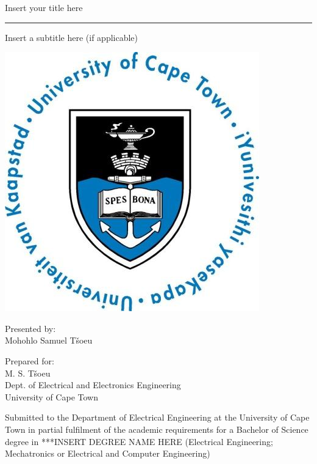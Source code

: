 \documentclass[a4paper,11pt]{report}
\begin{document}
 
\thispagestyle{empty}
{\Huge \begin{center}
Insert your title here
\hrule 
{\Large Insert a subtitle here (if applicable)}
\end{center}}

\vskip 5mm
\begin{center}
\- \- \- \- \- \- \- \- \- \-\includegraphics[scale = 0.3]{uctLogo.png}
\end{center}

\vskip 5mm
\begin{center}
Presented by:\\
Mohohlo Samuel T\v soeu		%
\end{center}

\vskip 10mm
\begin{center}
Prepared for:\\
M. S. T\v soeu\\ 		%
Dept. of Electrical and Electronics Engineering\\University of Cape Town
\end{center}


\vskip 10mm
\begin{center}
Submitted to the Department of Electrical Engineering at the University of Cape Town in partial
fulfilment of the academic requirements for a Bachelor of Science degree in ***INSERT DEGREE
NAME HERE (Electrical Engineering; Mechatronics or Electrical and Computer Engineering)

\end{center}
\end{document}
